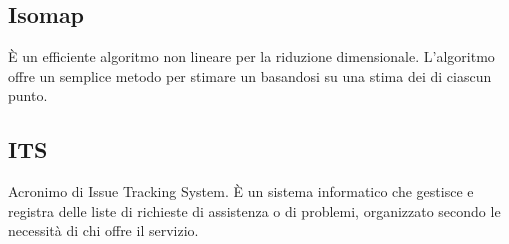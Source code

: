 \subsection*{Isomap}
È un efficiente algoritmo non lineare per la riduzione dimensionale. L'algoritmo offre un semplice metodo per stimare un  basandosi su una stima dei  di ciascun punto.

\subsection*{ITS}
Acronimo di Issue Tracking System. È un sistema informatico che gestisce e registra delle liste di richieste di assistenza o di problemi, organizzato secondo le necessità di chi offre il servizio.